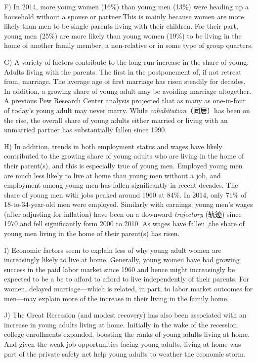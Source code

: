 \documentclass[UTF8,11pt]{ctexart}
\begin{document}
F) In 2014, more young women (16\%) than young men (13\%) were heading up a household without a spouse or partner.This is mainly because women are more likely than men to be single parents living with their children. For their part, young men (25\%) are more likely than young women (19\%) to be living in the home of another family member, a non-relative or in some type of group quarters.


G) A variety of factors contribute to the long-run increase in the share of young. Adults living with the parents. The first in the postponement of, if not retreat from, marriage. The average age of first marriage has risen steadily for decades. In addition, a growing share of young adult may be avoiding marriage altogether. A previous Pew Research Center analysis projected that as many as one-in-four of today’s young adult may never marry. While\textit{ cohabitation}（同居）has been on the rise, the overall share of young adults either married or living with an unmarried partner has substantially fallen since 1990.


H) In addition, trends in both employment status and wages have likely contributed to the growing share of young adults who are living in the home of their parent(s), and this is especially true of young men. Employed young men are much less likely to live at home than young men without a job, and employment among young men has fallen significantly in recent decades. The share of young men with jobs peaked around 1960 at 84\%. In 2014, only 71\% of 18-to-34-year-old men were employed. Similarly with earnings, young men’s wages (after adjusting for inflation) have been on a downward\textit{ trajectory} (轨迹) since 1970 and fell significantly form 2000 to 2010. As wages have fallen ,the share of young men living in the home of their parent(s) has risen.


I) Economic factors seem to explain less of why young adult women are increasingly likely to live at home. Generally, young women have had growing success in the paid labor market since 1960 and hence might increasingly be expected to be a be to afford to afford to live independently of their parents. For women, delayed marriage—which is related, in part, to labor market outcomes for men—may explain more of the increase in their living in the family home.


J) The Great Recession (and modest recovery) has also been associated with an increase in young adults living at home. Initially in the wake of the recession, college enrollments expanded, boosting the ranks of young adults living at home. And given the weak job opportunities facing young adults, living at home was part of the private safety net help young adults to weather the economic storm.
\end{document}
